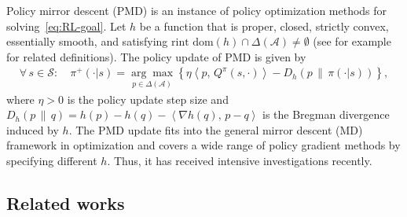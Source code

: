 \documentclass[10pt]{article}
\newcommand{\calA}{\mathcal{A}}
\newcommand{\calS}{\mathcal{S}}
\newcommand{\ls}{\left}
\newcommand{\rs}{\right}
\theoremstyle{plain}
\theoremstyle{definition}
\begin{document}
{Policy mirror descent} (PMD) is an instance of policy optimization methods for solving~\eqref{eq:RL-goal}. Let $h$ be a function that is proper, closed, strictly convex, essentially smooth, and satisfying $\mbox{rint dom}(h) \cap \Delta(\calA) \neq \emptyset$ (see for example \citet{beck2017first} for related definitions). The policy update of PMD is given by~\citep{Xiao_2022,Lan_2021}
\begin{align*}
    \forall\, s\in\calS: \quad \pi^+(\cdot|s) = \underset{p\in\Delta(\calA)}{\arg\max} \ls\{ \eta  \ls\langle p, \, Q^{\pi}(s,\cdot) \rs\rangle - D_h(p \, \| \, \pi(\cdot|s)) \rs\},
\end{align*}
where $\eta > 0$ is the policy update step size and $D_h(p \, \|\, q) = h(p) - h(q) - \ls\langle \nabla h(q), \, p-q \rs\rangle$ is the Bregman divergence induced by $h$. The PMD update fits into the general mirror descent (MD) framework in optimization \citet{Xiao_2022} and covers a wide range of policy gradient methods by specifying different $h$. Thus, it has received  intensive investigations recently. %



\subsection{Related works}
\end{document}
